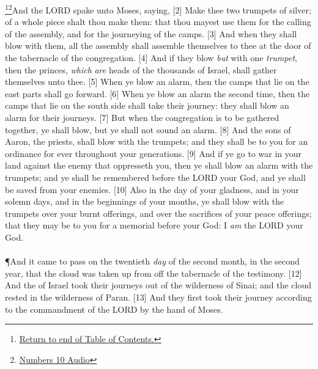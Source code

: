 \footnote{\textcolor[cmyk]{0.99998,1,0,0}{\hyperlink{TOC}{Return to end of Table of Contents.}}}\footnote{\href{https://audiobible.com/bible/numbers_10.html}{\textcolor[cmyk]{0.99998,1,0,0}{Numbers 10 Audio}}}\textcolor[cmyk]{0.99998,1,0,0}{And the LORD spake unto Moses, saying,}
[2] \textcolor[cmyk]{0.99998,1,0,0}{Make thee two trumpets of silver; of a whole piece shalt thou make them: that thou mayest use them for the calling of the assembly, and for the journeying of the camps.}
[3] \textcolor[cmyk]{0.99998,1,0,0}{And when they shall blow with them, all the assembly shall assemble themselves to thee at the door of the tabernacle of the congregation.}
[4] \textcolor[cmyk]{0.99998,1,0,0}{And if they blow \emph{but} with one \emph{trumpet}, then the princes, \emph{which} \emph{are} heads of the thousands of Israel, shall gather themselves unto thee.}
[5] \textcolor[cmyk]{0.99998,1,0,0}{When ye blow an alarm, then the camps that lie on the east parts shall go forward.}
[6] \textcolor[cmyk]{0.99998,1,0,0}{When ye blow an alarm the second time, then the camps that lie on the south side shall take their journey: they shall blow an alarm for their journeys.}
[7] \textcolor[cmyk]{0.99998,1,0,0}{But when the congregation is to be gathered together, ye shall blow, but ye shall not sound an alarm.}
[8] \textcolor[cmyk]{0.99998,1,0,0}{And the sons of Aaron, the priests, shall blow with the trumpets; and they shall be to you for an ordinance for ever throughout your generations.}
[9] \textcolor[cmyk]{0.99998,1,0,0}{And if ye go to war in your land against the enemy that oppresseth you, then ye shall blow an alarm with the trumpets; and ye shall be remembered before the LORD your God, and ye shall be saved from your enemies.}
[10] \textcolor[cmyk]{0.99998,1,0,0}{Also in the day of your gladness, and in your solemn days, and in the beginnings of your months, ye shall blow with the trumpets over your burnt offerings, and over the sacrifices of your peace offerings; that they may be to you for a memorial before your God: I \emph{am} the LORD your God.}\\
\\
\P \textcolor[cmyk]{0.99998,1,0,0}{And it came to pass on the twentieth \emph{day} of the second month, in the second year, that the cloud was taken up from off the tabernacle of the testimony.}
[12] \textcolor[cmyk]{0.99998,1,0,0}{And the  of Israel took their journeys out of the wilderness of Sinai; and the cloud rested in the wilderness of Paran.}
[13] \textcolor[cmyk]{0.99998,1,0,0}{And they first took their journey according to the commandment of the LORD by the hand of Moses.}
